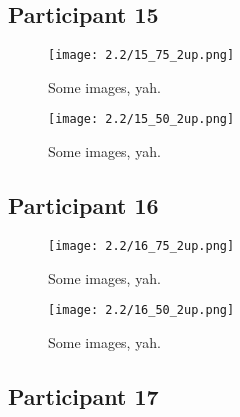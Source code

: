
\clearpage

\subsection{Participant 15}

\begin{figure}[h]
	\begin{center}
	\texttt{[image: 2.2/15\_75\_2up.png]}
	\caption{Some images, yah.}
	\end{center}
\end{figure}

\clearpage

\begin{figure}[h]
	\begin{center}
	\texttt{[image: 2.2/15\_50\_2up.png]}
	\caption{Some images, yah.}
	\end{center}
\end{figure}


\clearpage

\subsection{Participant 16}

\begin{figure}[h]
	\begin{center}
	\texttt{[image: 2.2/16\_75\_2up.png]}
	\caption{Some images, yah.}
	\end{center}
\end{figure}

\clearpage

\begin{figure}[h]
	\begin{center}
	\texttt{[image: 2.2/16\_50\_2up.png]}
	\caption{Some images, yah.}
	\end{center}
\end{figure}


\clearpage

\subsection{Participant 17}

